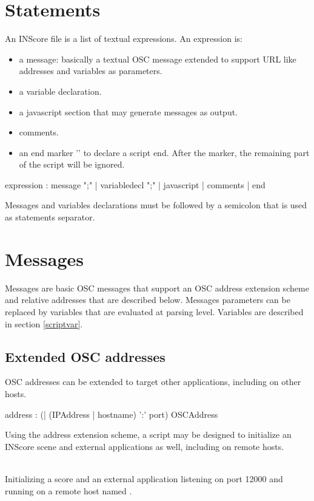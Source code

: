 \documentclass[a4paper,twoside]{report}
\newcommand{\sublevel}[1]	{\section{#1}}
\newcommand{\subsublevel}[1]	{\subsection{#1}}
\newcommand{\inscoreend}  {\_\_END\_\_}
\begin{document}
\sublevel{Statements}
\label{scriptstatement}
An INScore file is a list of textual expressions. An expression is:
\begin{itemize}
\item a message: basically a textual OSC message extended to support URL like addresses and variables as parameters.
\item a variable declaration.
\item a javascript section that may generate messages as output.
\item comments.
\item an end marker '\OSC{\inscoreend}' to declare a script end. After the marker, the remaining part of the script will be ignored.
\end{itemize}

\begin{rail}
expression :  
		 	message ";"
		| 	variabledecl ";"
		| 	javascript
		| 	comments
		|   end
\end{rail}

Messages and variables declarations must be followed by a semicolon that is used as statements separator.

\sublevel{Messages}
\label{scriptmsgs}

Messages are basic OSC messages that support an OSC address extension scheme and relative addresses that are described below.
Messages parameters can be replaced by variables that are evaluated at parsing level. Variables are described in section \ref{scriptvar}.

\subsublevel{Extended OSC addresses}
\label{extaddress}

OSC addresses can be extended to target other applications, including on other hosts.

\begin{rail} 
address : (| (IPAddress | hostname) ':' port)  OSCAddress
\end{rail}

Using the address extension scheme, a script may be designed to initialize an INScore scene and external applications as well, including on remote hosts.

\example\\
Initializing a score and an external application listening on port 12000 and running on a remote host named .
\end{document}
